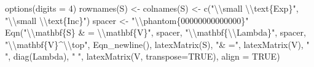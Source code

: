 \documentclass[
  letterpaper,
  10pt,
  krantz2]{krantz}
\makeatletter
\newenvironment{Shaded}{\begin{snugshade}}{\end{snugshade}}
\newcommand{\AttributeTok}[1]{\textcolor[rgb]{0.40,0.45,0.13}{#1}}
\newcommand{\ConstantTok}[1]{\textcolor[rgb]{0.56,0.35,0.01}{#1}}
\newcommand{\DecValTok}[1]{\textcolor[rgb]{0.68,0.00,0.00}{#1}}
\newcommand{\FunctionTok}[1]{\textcolor[rgb]{0.28,0.35,0.67}{#1}}
\newcommand{\NormalTok}[1]{\textcolor[rgb]{0.00,0.23,0.31}{#1}}
\newcommand{\OtherTok}[1]{\textcolor[rgb]{0.00,0.23,0.31}{#1}}
\newcommand{\SpecialCharTok}[1]{\textcolor[rgb]{0.37,0.37,0.37}{#1}}
\newcommand{\StringTok}[1]{\textcolor[rgb]{0.13,0.47,0.30}{#1}}
\newenvironment{kframe}{%
  \medskip{}
  \setlength{\fboxsep}{.8em}
  \def\at@end@of@kframe{}%
  \ifinner\ifhmode%
  \def\at@end@of@kframe{\end{minipage}}%
  \begin{minipage}{\columnwidth}%
  \fi\fi%
  \def\FrameCommand##1{\hskip\@totalleftmargin \hskip-\fboxsep
  \colorbox{shadecolor}{##1}\hskip-\fboxsep
      \hskip-\linewidth \hskip-\@totalleftmargin \hskip\columnwidth}%
  \MakeFramed {\advance\hsize-\width
    \@totalleftmargin\z@ \linewidth\hsize
    \@setminipage}}%
{\par\unskip\endMakeFramed%
  \at@end@of@kframe}
\renewenvironment{Shaded}{\begin{kframe}}{\end{kframe}}
\makeatother
\begin{document}
\begin{Shaded}
\begin{Highlighting}[]
\FunctionTok{options}\NormalTok{(}\AttributeTok{digits =} \DecValTok{4}\NormalTok{)}
\FunctionTok{rownames}\NormalTok{(S) }\OtherTok{\textless{}{-}} \FunctionTok{colnames}\NormalTok{(S) }\OtherTok{\textless{}{-}} \FunctionTok{c}\NormalTok{(}\StringTok{"}\SpecialCharTok{\textbackslash{}\textbackslash{}}\StringTok{small }\SpecialCharTok{\textbackslash{}\textbackslash{}}\StringTok{text\{Exp\}"}\NormalTok{, }
                                \StringTok{"}\SpecialCharTok{\textbackslash{}\textbackslash{}}\StringTok{small }\SpecialCharTok{\textbackslash{}\textbackslash{}}\StringTok{text\{Inc\}"}\NormalTok{)}
\NormalTok{spacer }\OtherTok{\textless{}{-}} \StringTok{"}\SpecialCharTok{\textbackslash{}\textbackslash{}}\StringTok{phantom\{00000000000000\}"}
\FunctionTok{Eqn}\NormalTok{(}\StringTok{"}\SpecialCharTok{\textbackslash{}\textbackslash{}}\StringTok{mathbf\{S\} \& = }\SpecialCharTok{\textbackslash{}\textbackslash{}}\StringTok{mathbf\{V\}"}\NormalTok{, spacer,}
    \StringTok{"}\SpecialCharTok{\textbackslash{}\textbackslash{}}\StringTok{mathbf\{}\SpecialCharTok{\textbackslash{}\textbackslash{}}\StringTok{Lambda\}"}\NormalTok{, spacer,  }
    \StringTok{"}\SpecialCharTok{\textbackslash{}\textbackslash{}}\StringTok{mathbf\{V\}\^{}}\SpecialCharTok{\textbackslash{}\textbackslash{}}\StringTok{top"}\NormalTok{, }\FunctionTok{Eqn\_newline}\NormalTok{(),}
    \FunctionTok{latexMatrix}\NormalTok{(S), }\StringTok{"\& ="}\NormalTok{, }
    \FunctionTok{latexMatrix}\NormalTok{(V), }\StringTok{"  "}\NormalTok{, }\FunctionTok{diag}\NormalTok{(Lambda), }\StringTok{"  "}\NormalTok{, }\FunctionTok{latexMatrix}\NormalTok{(V, }\AttributeTok{transpose=}\ConstantTok{TRUE}\NormalTok{),}
    \AttributeTok{align =} \ConstantTok{TRUE}\NormalTok{)}
\end{Highlighting}
\end{Shaded}
\end{document}
